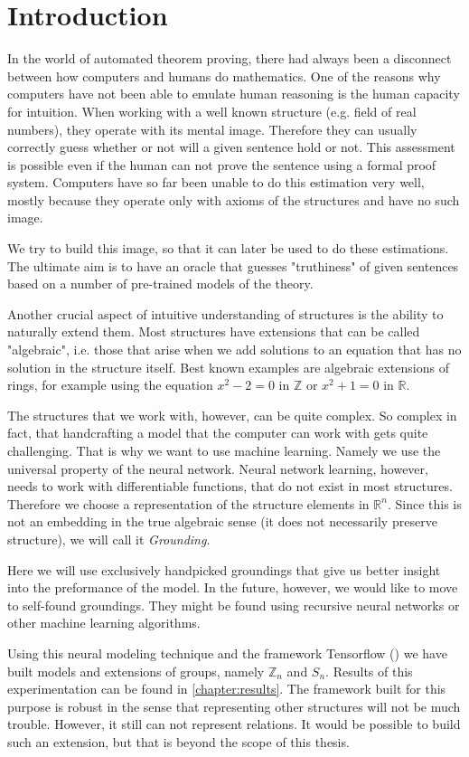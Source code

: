 \chapter*{Introduction}
\label{intro}

In the world of automated theorem proving, there had always been a disconnect between how computers and humans do mathematics. One of the reasons why computers have not been able to emulate human reasoning is the human capacity for intuition. When working with a well known structure (e.g. field of real numbers), they operate with its mental image. Therefore they can usually correctly guess whether or not will a given sentence hold or not. This assessment is possible even if the human can not prove the sentence using a formal proof system. Computers have so far been unable to do this estimation very well, mostly because they operate only with axioms of the structures and have no such image.

We try to build this image, so that it can later be used to do these estimations. The ultimate aim is to have an oracle that guesses "truthiness" of given sentences based on a number of pre-trained models of the theory. 

Another crucial aspect of intuitive understanding of structures is the ability to naturally extend them. Most structures have extensions that can be called "algebraic", i.e. those that arise when we add solutions to an equation that has no solution in the structure itself. Best known examples are algebraic extensions of rings, for example using the equation $x^2-2=0$ in $\mathbb{Z}$ or $x^2+1=0$ in $\mathbb{R}$.

The structures that we work with, however, can be quite complex. So complex in fact, that handcrafting a model that the computer can work with gets quite challenging. That is why we want to use machine learning. Namely we use the universal property of the neural network. Neural network learning, however, needs to work with differentiable functions, that do not exist in most structures. Therefore we choose a representation of the structure elements in $\mathbb{R}^n$. Since this is not an embedding in the true algebraic sense (it does not necessarily preserve structure), we will call it \textit{Grounding}. 

Here we will use exclusively handpicked groundings that give us better insight into the preformance of the model. In the future, however, we would like to move to self-found groundings. They might be found using recursive neural networks or other machine learning algorithms.

Using this neural modeling technique and the framework Tensorflow (\cite{tf}) we have built models and extensions of groups, namely $\mathbb{Z}_n$ and $S_n$. Results of this experimentation can be found in \autoref{chapter:results}. The framework built for this purpose is robust in the sense that representing other structures will not be much trouble. However, it still can not represent relations. It would be possible to build such an extension, but that is beyond the scope of this thesis. 